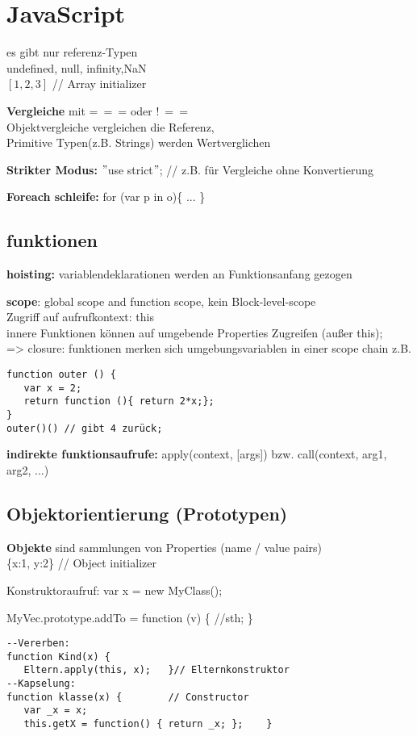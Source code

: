 \section{JavaScript}
es gibt nur referenz-Typen \\
undefined, null, infinity,NaN\\
$\left[1,2,3\right]$ // Array initializer 



\textbf{Vergleiche} mit =~\!=~\!= oder !~\!=~\!= \\
Objektvergleiche vergleichen die Referenz,\\ 
Primitive Typen(z.B. Strings) werden Wertverglichen

\textbf{Strikter Modus:} $"$use strict$"$; // z.B. für Vergleiche ohne Konvertierung 


\textbf{Foreach schleife:} for (var p in o)\{ ... \}
\subsection{funktionen}
\textbf{hoisting:} variablendeklarationen werden an Funktionsanfang gezogen

\textbf{scope}: global scope and function scope, kein Block-level-scope\\ 
Zugriff auf aufrufkontext: this  \\
innere Funktionen können auf umgebende Properties Zugreifen (außer this); \\
=> closure: funktionen merken sich umgebungsvariablen in einer scope chain
z.B. 
\begin{verbatim}
function outer () {
   var x = 2;
   return function (){ return 2*x;};
}
outer()() // gibt 4 zurück;
\end{verbatim}

\textbf{indirekte funktionsaufrufe:} apply(context, [args]) bzw. call(context, arg1, arg2, ...)
\subsection{ Objektorientierung (Prototypen)}
\textbf{Objekte} sind sammlungen von Properties (name / value pairs) \\
\{x:1, y:2\} // Object initializer 

Konstruktoraufruf: var x = new MyClass();

MyVec.prototype.addTo = function (v) \{ //sth; \} 
\begin{verbatim}
--Vererben:
function Kind(x) {
   Eltern.apply(this, x);   }// Elternkonstruktor
--Kapselung: 
function klasse(x) {		// Constructor
   var _x = x;
   this.getX = function() { return _x; };    }
\end{verbatim}


